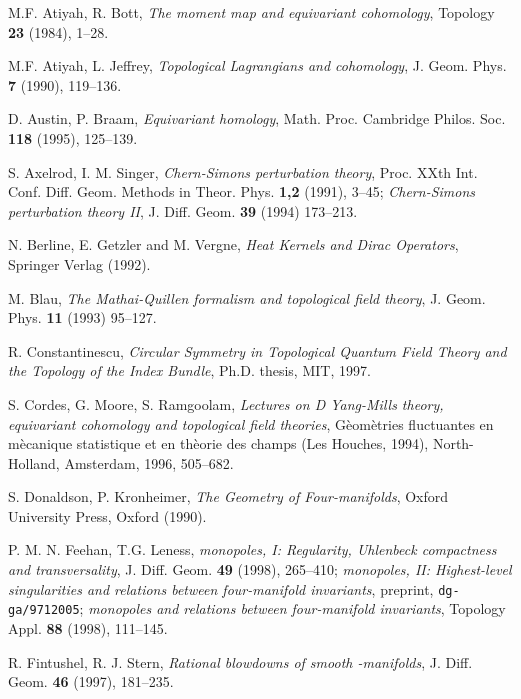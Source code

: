 \documentclass[a4paper,12pt,reqno,sumlimits]{amsart}
\theoremstyle{plain}
\theoremstyle{definition}
\providecommand{\1}{{\bf 1}}
\numberwithin{equation}{section}
\begin{document}
\begin{thebibliography}{999}
  

 M.F. Atiyah, R. Bott, {\em The moment map and equivariant
    cohomology}, Topology {\bf 23} (1984), 1--28.
  
 M.F. Atiyah, L. Jeffrey, {\em Topological Lagrangians and
    cohomology}, J. Geom. Phys. {\bf 7} (1990), 119--136.
  
 D. Austin, P. Braam, {\em Equivariant homology}, Math. Proc.
  Cambridge Philos. Soc. {\bf 118} (1995), 125--139.
  
 S. Axelrod, I. M. Singer, {\em Chern-Simons perturbation
    theory}, Proc. XXth Int. Conf. Diff. Geom. Methods in Theor. Phys. {\bf
    1,2} (1991), 3--45; {\em Chern-Simons perturbation theory II}, J. Diff.
  Geom. {\bf 39} (1994) 173--213.
  
 N. Berline, E. Getzler and M. Vergne, {\em Heat Kernels and
    Dirac Operators}, Springer Verlag (1992).
  
 M. Blau, {\em The Mathai-Quillen formalism and topological
    field theory}, J. Geom. Phys. {\bf 11} (1993) 95--127.
  
 R. Constantinescu, {\em Circular Symmetry in Topological
    Quantum Field Theory and the Topology of the Index Bundle}, Ph.D. thesis,
  MIT, 1997.
  
 S. Cordes, G. Moore, S. Ramgoolam, {\em Lectures on \coordHE{}D
    Yang-Mills theory, equivariant cohomology and topological field
    theories}, G\`eom\`etries fluctuantes en m\`ecanique statistique et en
  th\`eorie des champs (Les Houches, 1994), North-Holland, Amsterdam, 1996,
  505--682.
  
 S. Donaldson, P. Kronheimer, {\em The Geometry of
    Four-manifolds}, Oxford University Press, Oxford (1990).
  
 P. M. N. Feehan, T.G. Leness, {\em {}\coordHE{} monopoles, I:
    Regularity, Uhlenbeck compactness and transversality}, J. Diff. Geom.
  {\bf 49} (1998), 265--410; {\em {}\coordHE{} monopoles, II: Highest-level
    singularities and relations between four-manifold invariants}, preprint,
  \texttt{dg-ga/9712005}; {\em {}\coordHE{} monopoles and relations between
    four-manifold invariants}, Topology Appl. {\bf 88} (1998), 111--145.
  
 R. Fintushel, R. J. Stern, {\em Rational blowdowns of smooth \coordHE{}-manifolds},
  J. Diff. Geom. {\bf 46} (1997), 181--235. 


\end{thebibliography}
\end{document}
